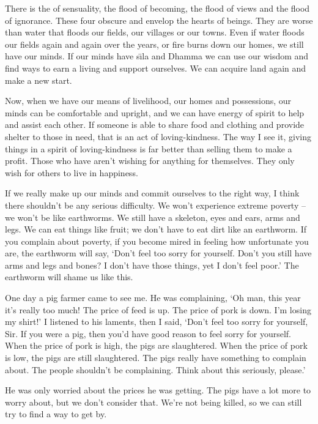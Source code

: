 There is the  of sensuality, the flood of becoming, the flood of views and the flood of ignorance. These four obscure and envelop the hearts of beings. They are worse than water that floods our fields, our villages or our towns. Even if water floods our fields again and again over the years, or fire burns down our homes, we still have our minds. If our minds have s\={\i}la and Dhamma we can use our wisdom and find ways to earn a living and support ourselves. We can acquire land again and make a new start. 

Now, when we have our means of livelihood, our homes and possessions, our minds can be comfortable and upright, and we can have energy of spirit to help and assist each other. If someone is able to share food and clothing and provide shelter to those in need, that is an act of loving-kindness. The way I see it, giving things in a spirit of loving-kindness is far better than selling them to make a profit. Those who have  aren't wishing for anything for themselves. They only wish for others to live in happiness. 

If we really make up our minds and commit ourselves to the right way, I think there shouldn't be any serious difficulty. We won't experience \mbox{extreme} poverty -- we won't be like earthworms. We still have a skeleton, eyes and ears, arms and legs. We can eat things like fruit; we don't have to eat dirt like an earthworm. If you complain about poverty, if you become mired in feeling how unfortunate you are, the earthworm will say, `Don't feel too sorry for yourself. Don't you still have arms and legs and bones? I don't have those things, yet I don't feel poor.' The earthworm will shame us like this. 

One day a pig farmer came to see me. He was complaining, `Oh man, this year it's really too much! The price of feed is up. The price of pork is down. I'm losing my shirt!' I listened to his laments, then I said, `Don't feel too sorry for yourself, Sir. If you were a pig, then you'd have good reason to feel sorry for yourself. When the price of pork is high, the pigs are slaughtered. When the price of pork is low, the pigs are still slaughtered. The pigs really have something to complain about. The people shouldn't be complaining. Think about this seriously, please.' 

He was only worried about the prices he was getting. The pigs have a lot more to worry about, but we don't consider that. We're not being killed, so we can still try to find a way to get by. 

